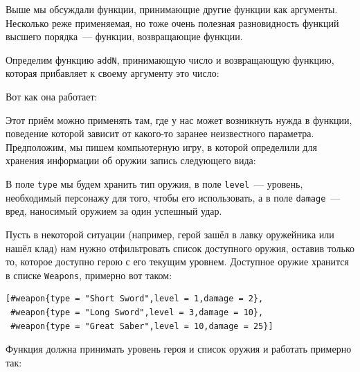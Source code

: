 \documentclass[
  paper=a4,
  fontsize=14pt,
  openany,
  appendixprefix=true
]{scrbook}
\begin{document}
Выше мы обсуждали функции, принимающие другие функции как аргументы. Несколько реже применяемая, но тоже очень полезная разновидность функций высшего порядка~--- функции, возвращающие функции.

Определим функцию \lstinline{addN}, принимающую число и возвращающую функцию, которая прибавляет к своему аргументу это число:



Вот как она работает:


Этот приём можно применять там, где у нас может возникнуть нужда в функции, поведение которой зависит от какого-то заранее неизвестного параметра. Предположим, мы пишем компьютерную игру, в которой определили для хранения информации об оружии запись следующего вида:



В поле \lstinline{type} мы будем хранить тип оружия, в поле \lstinline{level}~--- уровень, необходимый персонажу для того, чтобы его использовать, а в поле \lstinline{damage}~--- вред, наносимый оружием за один успешный удар.

Пусть в некоторой ситуации (например, герой зашёл в лавку оружейника или нашёл клад) нам нужно отфильтровать список доступного оружия, оставив только то, которое доступно герою с его текущим уровнем. Доступное оружие хранится в списке \lstinline{Weapons}, примерно вот таком:
\begin{verbatim}
[#weapon{type = "Short Sword",level = 1,damage = 2},
 #weapon{type = "Long Sword",level = 3,damage = 10},
 #weapon{type = "Great Saber",level = 10,damage = 25}]
\end{verbatim}

Функция должна принимать уровень героя и список оружия и работать примерно так:

\end{document}
